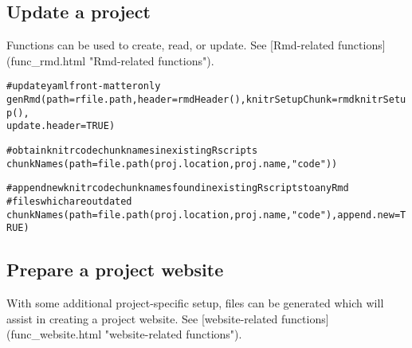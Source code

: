 \documentclass{article}\usepackage[]{graphicx}\usepackage[]{color}
\makeatletter
\newcommand{\hlnum}[1]{\textcolor[rgb]{0.863,0.196,0.184}{#1}}%
\newcommand{\hlstr}[1]{\textcolor[rgb]{0.863,0.196,0.184}{#1}}%
\newcommand{\hlcom}[1]{\textcolor[rgb]{0.345,0.431,0.459}{#1}}%
\newcommand{\hlstd}[1]{\textcolor[rgb]{0.514,0.58,0.588}{#1}}%
\newcommand{\hlkwc}[1]{\textcolor[rgb]{0.796,0.294,0.086}{#1}}%
\newcommand{\hlkwd}[1]{\textcolor[rgb]{0.576,0.631,0.631}{#1}}%
\newenvironment{kframe}{%
 \def\at@end@of@kframe{}%
 \ifinner\ifhmode%
  \def\at@end@of@kframe{\end{minipage}}%
  \begin{minipage}{\columnwidth}%
 \fi\fi%
 \def\FrameCommand##1{\hskip\@totalleftmargin \hskip-\fboxsep
 \colorbox{shadecolor}{##1}\hskip-\fboxsep
     \hskip-\linewidth \hskip-\@totalleftmargin \hskip\columnwidth}%
 \MakeFramed {\advance\hsize-\width
   \@totalleftmargin\z@ \linewidth\hsize
   \@setminipage}}%
 {\par\unskip\endMakeFramed%
 \at@end@of@kframe}
\newenvironment{knitrout}{}{} %
\makeatother
\begin{document}
\subsection{Update a project}
Functions can be used to create, read, or update. See [Rmd-related functions](func\_rmd.html "Rmd-related functions").

\begin{knitrout}
\color{fgcolor}\begin{kframe}
\begin{alltt}
\hlcom{# update yaml front-matter only}
\hlkwd{genRmd}\hlstd{(}\hlkwc{path} \hlstd{= rfile.path,} \hlkwc{header} \hlstd{=} \hlkwd{rmdHeader}\hlstd{(),} \hlkwc{knitrSetupChunk} \hlstd{=} \hlkwd{rmdknitrSetup}\hlstd{(),}
    \hlkwc{update.header} \hlstd{=} \hlnum{TRUE}\hlstd{)}

\hlcom{# obtain knitr code chunk names in existing R scripts}
\hlkwd{chunkNames}\hlstd{(}\hlkwc{path} \hlstd{=} \hlkwd{file.path}\hlstd{(proj.location, proj.name,} \hlstr{"code"}\hlstd{))}

\hlcom{# append new knitr code chunk names found in existing R scripts to any Rmd}
\hlcom{# files which are outdated}
\hlkwd{chunkNames}\hlstd{(}\hlkwc{path} \hlstd{=} \hlkwd{file.path}\hlstd{(proj.location, proj.name,} \hlstr{"code"}\hlstd{),} \hlkwc{append.new} \hlstd{=} \hlnum{TRUE}\hlstd{)}
\end{alltt}
\end{kframe}
\end{knitrout}

\subsection{Prepare a project website}
With some additional project-specific setup, files can be generated which will assist in creating a project website.
See [website-related functions](func\_website.html "website-related functions").
\end{document}
